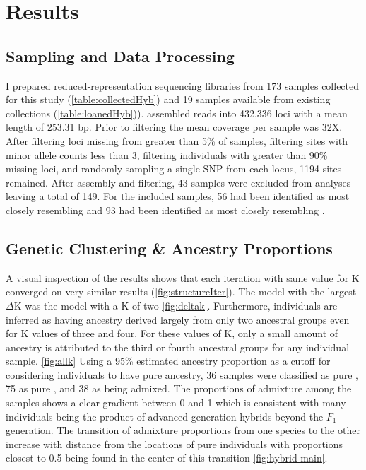 \section{Results}
\subsection{Sampling and Data Processing}
I prepared reduced-representation sequencing libraries from 173 samples collected 
for this study (\cref{table:collectedHyb}) and 19 samples available from existing 
collections (\cref{table:loanedHyb})). 
\stacks assembled reads into 432,336 loci with a mean length of 253.31 bp.
Prior to filtering the mean coverage per sample was 32X.
After filtering loci missing from greater than 5\% of samples, filtering sites with   
minor allele counts less than 3, filtering individuals with greater than 90\% 
missing loci, and randomly sampling a single SNP from each locus, 1194 sites
remained.
After assembly and filtering, 43 samples were excluded from analyses leaving a total of 149. 
For the included samples, 56 had been identified as most closely resembling \amer 
and 93 had been identified as most closely resembling \terr. 

\subsection{Genetic Clustering \& Ancestry Proportions}
A visual inspection of the \structure results shows that each iteration with  
same value for K converged on very similar results (\cref{fig:structureIter}). 
The \structure model with the largest $\Delta$K was the model with a K of two \cref{fig:deltak}.
Furthermore, individuals are inferred as having ancestry derived largely 
from only two ancestral groups even for K values of three and four. For these values
of K, only a small amount of ancestry is attributed to the third or fourth 
ancestral groups for any individual sample. \cref{fig:allk} 
Using a 95\% estimated ancestry proportion as a cutoff for considering individuals to have
pure ancestry, 36 samples were classified as pure \amer, 75 as pure \terr, and  
38 as being admixed. 
The proportions of admixture among the samples shows a clear gradient between 0 
and 1 which is consistent with many individuals being the product of advanced 
generation hybrids beyond the $F_1$ generation.
The transition of admixture proportions from one species to the other 
increase with distance from the locations of pure individuals with proportions 
closest to 0.5 being found in the center of this transition \cref{fig:hybrid-main}.


